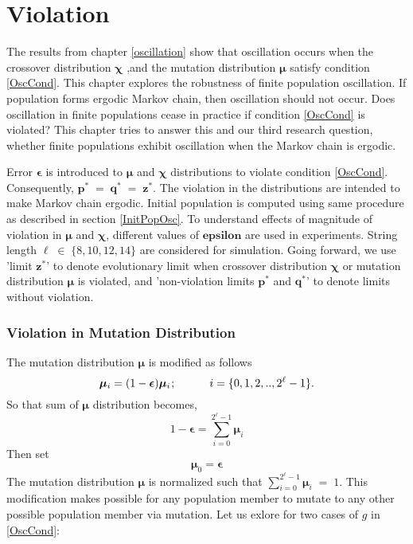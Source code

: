 \chapter{Violation} \label{ch:evolutionary limits}
The results from chapter \ref{oscillation} show that oscillation occurs
when the crossover distribution $\bm{\chi}$ ,and the mutation distribution $\bm{\mu}$ 
satisfy condition \ref{OscCond}. This chapter explores the robustness of finite population oscillation. 
If population forms ergodic Markov chain, then oscillation should not occur. Does oscillation 
in finite populations cease in practice if condition \ref{OscCond} is violated? 
This chapter tries to answer this and our  
third research question, whether finite populations exhibit oscillation when the Markov chain 
is ergodic.

Error $\bm{\epsilon}$ is introduced to $\bm{\mu}$ and $\bm{\chi}$ distributions to 
violate condition \ref{OscCond}. Consequently, $\bm{p}^\ast \;=\; \bm{q}^\ast \;=\; \bm{z}^\ast$. 
The violation in the distributions are intended to make Markov chain ergodic. Initial population is 
computed using same procedure as described in section \ref{InitPopOsc}. To understand effects of magnitude 
of violation in $\bm{\mu}$ and $\bm{\chi}$, different values of $\bm{epsilon}$ are used in experiments. 
String length $\ell \;\in\; \{8, 10, 12, 14\}$ are considered for simulation.
Going forward, we use 'limit $\bm{z}^\ast$' to denote evolutionary limit when crossover distribution 
$\bm{\chi}$ or mutation distribution $\bm{\mu}$ is violated, and 
'non-violation limits $\bm{p}^\ast$ and $\bm{q}^\ast$' to denote limits without violation.

\subsection{Violation in Mutation Distribution}
The mutation distribution $\bm{\mu}$ is modified as follows
\[
\bm{\mu}_i = (1-\bm{\epsilon}) \bm{\mu}_i \hspace{0.01in}; \hspace{30pt} i = \{0, 1, 2,.., 2^{\ell}-1\}.
\]
So that sum of $\bm{\mu}$ distribution becomes, 
\[
1-\bm{\epsilon} = \sum \limits_{i=0}^{2^{\ell}-1} \bm{\mu}_i
\]
Then set
\[
\bm{\mu}_0 = \bm{\epsilon}
\]
The mutation distribution $\bm{\mu}$ is normalized such that  $\sum\limits_{i=0}^{2^{\ell}-1}\bm{\mu}_i \;=\; 1$.
This modification makes possible for any population member to mutate to any other possible population member via mutation. 
Let us exlore for two cases of $g$ in \ref{OscCond}:

